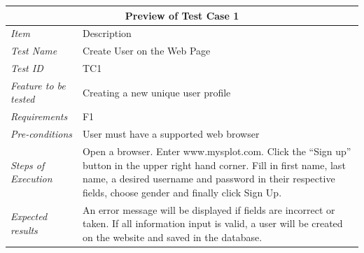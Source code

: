 \begin{minipage}{\linewidth}
\setlength{\tabcolsep}{15pt}
\centering
{}
\begin{tabular}{ |l|p{70mm}| }
	\hline
	\multicolumn{2}{|c|}{\cellcolor{gray!25} \textbf{Preview of Test Case 1}} \\
	\hline
	\it{\cellcolor{gray!25}Item} & {\cellcolor{gray!25} Description } \\
	\hline
	\it{\cellcolor{gray!25}Test Name } & Create User on the Web Page \\ \hline
	\it{\cellcolor{gray!25}Test ID} & TC1 \\ \hline
	\it{\cellcolor{gray!25}Feature to be tested} & Creating a new unique user profile \\ \hline
	\it{\cellcolor{gray!25}Requirements} & F1  \\ \hline
	\it{\cellcolor{gray!25}Pre-conditions} & User must have a supported web browser  \\ \hline
	\it{\cellcolor{gray!25}Steps of Execution} & Open a browser. Enter www.mysplot.com. Click the ``Sign up'' button in the upper right hand corner. Fill in first name, last name, a desired username and password in their respective fields, choose gender and finally click Sign Up. \\ \hline
	\it{\cellcolor{gray!25}Expected results} & An error message will be displayed if fields are incorrect or taken. If all information input is valid, a user will be created on the website and saved in the database.  \\
	\hline
\end{tabular}
\medskip
\end{minipage}
%
